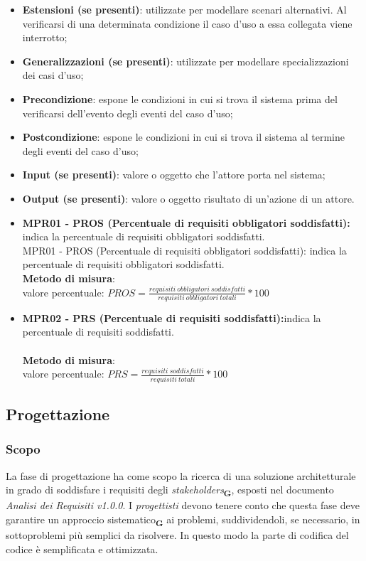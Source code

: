 \begin{itemize}
    \item \textbf{Estensioni (se presenti)}: utilizzate per modellare scenari alternativi. Al verificarsi di una determinata condizione il caso d'uso a essa collegata viene interrotto;
    \item \textbf{Generalizzazioni (se presenti)}: utilizzate per modellare specializzazioni dei casi d'uso;
    \item \textbf{Precondizione}: espone le condizioni in cui si trova il sistema prima del verificarsi dell'evento degli eventi del caso d'uso;
    \item \textbf{Postcondizione}: espone le condizioni in cui si trova il sistema al termine degli eventi del caso d'uso;
    \item \textbf{Input (se presenti)}: valore o oggetto che l'attore porta nel sistema;
    \item \textbf{Output (se presenti)}: valore o oggetto risultato di un'azione di un attore.
\end{itemize}
\begin{itemize}
    \item \textbf{MPR01 - PROS (Percentuale di requisiti obbligatori soddisfatti):} indica la percentuale di requisiti obbligatori soddisfatti.\\
          MPR01 - PROS (Percentuale di requisiti obbligatori soddisfatti): indica la percentuale di requisiti obbligatori soddisfatti.
          \\\textbf{Metodo di misura}:\\valore percentuale: $PROS = \frac{requisiti \ obbligatori \ soddisfatti}{requisiti \ obbligatori \ totali} * 100$
    \item \textbf{MPR02 - PRS (Percentuale di requisiti soddisfatti):}indica la percentuale di requisiti soddisfatti.\\
          \\\textbf{Metodo di misura}:\\valore percentuale: $PRS = \frac{requisiti \ soddisfatti}{requisiti \ totali} * 100$
\end{itemize}
\subsection{Progettazione}
\subsubsection{Scopo}
La fase di progettazione ha come scopo la ricerca di una soluzione architetturale in grado di soddisfare i requisiti degli \textit{stakeholders}\textsubscript{\textbf{G}}, esposti nel documento \textit{Analisi dei Requisiti v1.0.0}.
I \textit{progettisti} devono tenere conto che questa fase deve garantire un approccio sistematico\textsubscript{\textbf{G}} ai problemi, suddividendoli, se necessario, in sottoproblemi più semplici da risolvere.
In questo modo la parte di codifica del codice è semplificata e ottimizzata.
